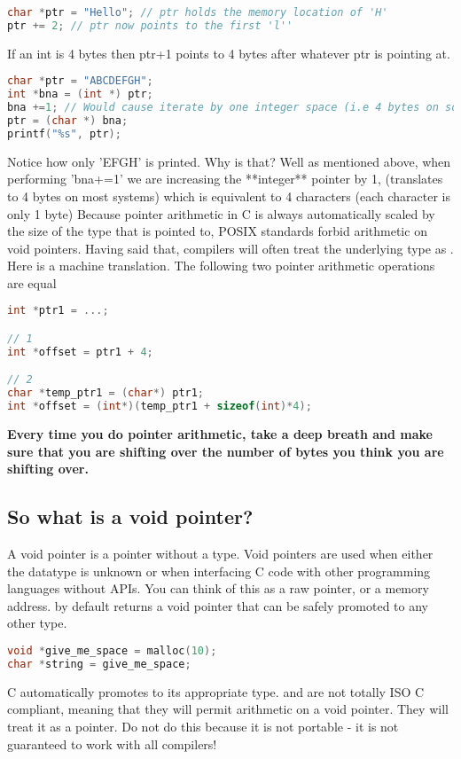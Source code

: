 \begin{lstlisting}[language=C]
char *ptr = "Hello"; // ptr holds the memory location of 'H'
ptr += 2; // ptr now points to the first 'l''
\end{lstlisting}

If an int is 4 bytes then ptr+1 points to 4 bytes after whatever ptr is pointing at.

\begin{lstlisting}[language=C]
char *ptr = "ABCDEFGH";
int *bna = (int *) ptr;
bna +=1; // Would cause iterate by one integer space (i.e 4 bytes on some systems)
ptr = (char *) bna;
printf("%s", ptr);
\end{lstlisting}

Notice how only 'EFGH' is printed.
Why is that? Well as mentioned above, when performing 'bna+=1' we are increasing the **integer** pointer by 1, (translates to 4 bytes on most systems) which is equivalent to 4 characters (each character is only 1 byte)
Because pointer arithmetic in C is always automatically scaled by the size of the type that is pointed to, POSIX standards forbid arithmetic on void pointers.
Having said that, compilers will often treat the underlying type as .
Here is a machine translation.
The following two pointer arithmetic operations are equal

\begin{lstlisting}[language=C]
int *ptr1 = ...;

// 1
int *offset = ptr1 + 4;

// 2
char *temp_ptr1 = (char*) ptr1;
int *offset = (int*)(temp_ptr1 + sizeof(int)*4);
\end{lstlisting}

\textbf{Every time you do pointer arithmetic, take a deep breath and make sure that you are shifting over the number of bytes you think you are shifting over.}

\subsection{So what is a void pointer?}

A void pointer is a pointer without a type.
Void pointers are used when either the datatype is unknown or when interfacing C code with other programming languages without APIs.
You can think of this as a raw pointer, or a memory address.
 by default returns a void pointer that can be safely promoted to any other type.

\begin{lstlisting}[language=C]
void *give_me_space = malloc(10);
char *string = give_me_space;
\end{lstlisting}

C automatically promotes  to its appropriate type.
 and  are not totally ISO C compliant, meaning that they will permit arithmetic on a void pointer.
They will treat it as a  pointer.
Do not do this because it is not portable - it is not guaranteed to work with all compilers!


